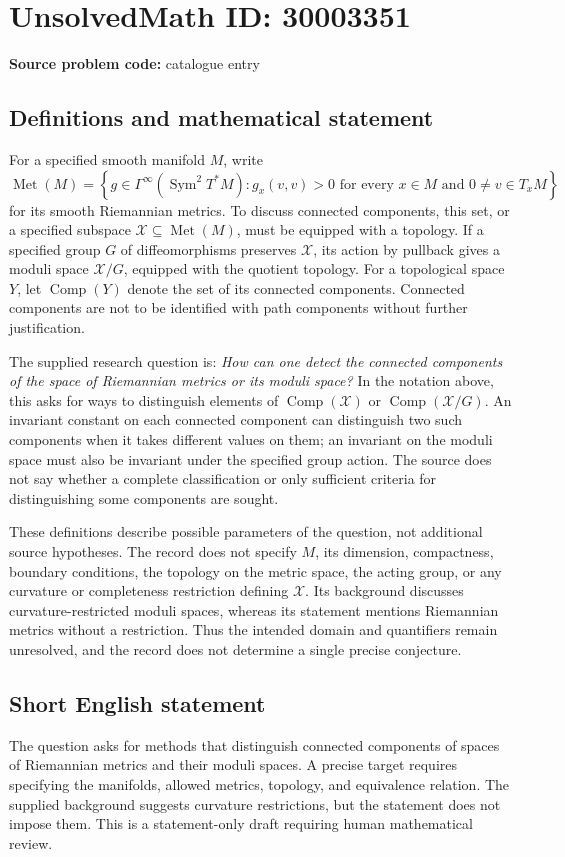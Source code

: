\documentclass[11pt]{article}
\begin{document}
\section*{UnsolvedMath ID: 30003351}
\textbf{Source problem code:} catalogue entry
\subsection{Definitions and mathematical statement}
For a specified smooth manifold \(M\), write
\[
\operatorname{Met}(M)=\left\{g\in\Gamma^\infty(\operatorname{Sym}^2T^*M):g_x(v,v)>0\text{ for every }x\in M\text{ and }0\ne v\in T_xM\right\}
\]
for its smooth Riemannian metrics. To discuss connected components, this set, or a specified subspace \(\mathcal X\subseteq\operatorname{Met}(M)\), must be equipped with a topology. If a specified group \(G\) of diffeomorphisms preserves \(\mathcal X\), its action by pullback gives a moduli space \(\mathcal X/G\), equipped with the quotient topology. For a topological space \(Y\), let \(\operatorname{Comp}(Y)\) denote the set of its connected components. Connected components are not to be identified with path components without further justification.

The supplied research question is: \emph{How can one detect the connected components of the space of Riemannian metrics or its moduli space?} In the notation above, this asks for ways to distinguish elements of \(\operatorname{Comp}(\mathcal X)\) or \(\operatorname{Comp}(\mathcal X/G)\). An invariant constant on each connected component can distinguish two such components when it takes different values on them; an invariant on the moduli space must also be invariant under the specified group action. The source does not say whether a complete classification or only sufficient criteria for distinguishing some components are sought.

These definitions describe possible parameters of the question, not additional source hypotheses. The record does not specify \(M\), its dimension, compactness, boundary conditions, the topology on the metric space, the acting group, or any curvature or completeness restriction defining \(\mathcal X\). Its background discusses curvature-restricted moduli spaces, whereas its statement mentions Riemannian metrics without a restriction. Thus the intended domain and quantifiers remain unresolved, and the record does not determine a single precise conjecture.
\subsection{Short English statement}
The question asks for methods that distinguish connected components of spaces of Riemannian metrics and their moduli spaces. A precise target requires specifying the manifolds, allowed metrics, topology, and equivalence relation. The supplied background suggests curvature restrictions, but the statement does not impose them. This is a statement-only draft requiring human mathematical review.
\end{document}
